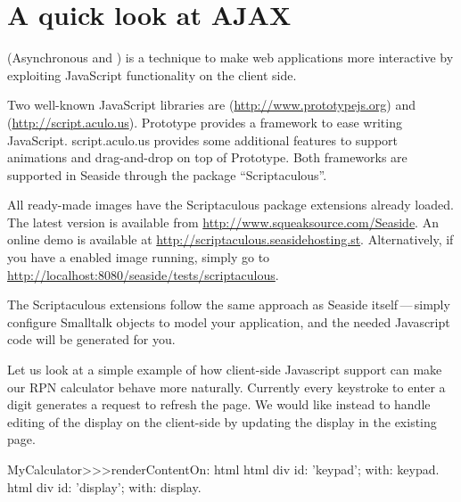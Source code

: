 \documentclass[a4paper,10pt,twoside]{book}
\begin{document}
\section{A quick look at AJAX}


 (Asynchronous  and ) is a technique to make web applications more interactive by exploiting JavaScript functionality on the client side.

Two well-known JavaScript libraries are  (\url{http://www.prototypejs.org}) and  (\url{http://script.aculo.us}).
Prototype provides a framework to ease writing JavaScript.
script.aculo.us provides some additional features to support animations and drag-and-drop on top of Prototype.
Both frameworks are supported in Seaside through the package ``Scriptaculous''.

All ready-made images have the Scriptaculous package extensions already loaded.
The latest version is available from \url{http://www.squeaksource.com/Seaside}.
An online demo is available at \url{http://scriptaculous.seasidehosting.st}.
Alternatively, if you have a enabled image running, simply go to \url{http://localhost:8080/seaside/tests/scriptaculous}.

The Scriptaculous extensions follow the same approach as Seaside itself\,---\,simply configure Smalltalk objects to model your application, and the needed Javascript code will be generated for you.

Let us look at a simple example of how client-side Javascript support can make our RPN calculator behave more naturally.
Currently every keystroke to enter a digit generates a request to refresh the page.
We would like instead to handle editing of the display on the client-side by updating the display in the existing page.


\begin{code}{}
MyCalculator>>>renderContentOn: html
	html div id: 'keypad'; with: keypad.
	html div id: 'display'; with: display.	
\end{code}
				
\end{document}
